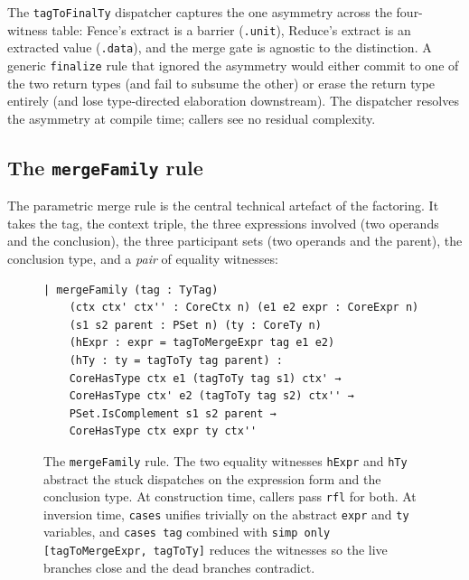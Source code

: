 \documentclass[acmsmall,screen,review,anonymous,nonacm]{acmart}
\begin{document}
The \texttt{tagToFinalTy} dispatcher captures the one asymmetry across the four-witness table: Fence's extract is a barrier (\texttt{.unit}), Reduce's extract is an extracted value (\texttt{.data}), and the merge gate is agnostic to the distinction. A generic \texttt{finalize} rule that ignored the asymmetry would either commit to one of the two return types (and fail to subsume the other) or erase the return type entirely (and lose type-directed elaboration downstream). The dispatcher resolves the asymmetry at compile time; callers see no residual complexity.

\subsection{The \texttt{mergeFamily} rule}\label{sec:mergefamily}

The parametric merge rule is the central technical artefact of the factoring. It takes the tag, the context triple, the three expressions involved (two operands and the conclusion), the three participant sets (two operands and the parent), the conclusion type, and a \emph{pair} of equality witnesses:

\begin{figure}[t]
\begin{lstlisting}
| mergeFamily (tag : TyTag)
    (ctx ctx' ctx'' : CoreCtx n) (e1 e2 expr : CoreExpr n)
    (s1 s2 parent : PSet n) (ty : CoreTy n)
    (hExpr : expr = tagToMergeExpr tag e1 e2)
    (hTy : ty = tagToTy tag parent) :
    CoreHasType ctx e1 (tagToTy tag s1) ctx' →
    CoreHasType ctx' e2 (tagToTy tag s2) ctx'' →
    PSet.IsComplement s1 s2 parent →
    CoreHasType ctx expr ty ctx''
\end{lstlisting}
\caption{The \texttt{mergeFamily} rule. The two equality witnesses \texttt{hExpr} and \texttt{hTy} abstract the stuck dispatches on the expression form and the conclusion type. At construction time, callers pass \texttt{rfl} for both. At inversion time, \texttt{cases} unifies trivially on the abstract \texttt{expr} and \texttt{ty} variables, and \texttt{cases tag} combined with \texttt{simp only [tagToMergeExpr, tagToTy]} reduces the witnesses so the live branches close and the dead branches contradict.}
\label{fig:mergefamily}
\end{figure}
\end{document}
